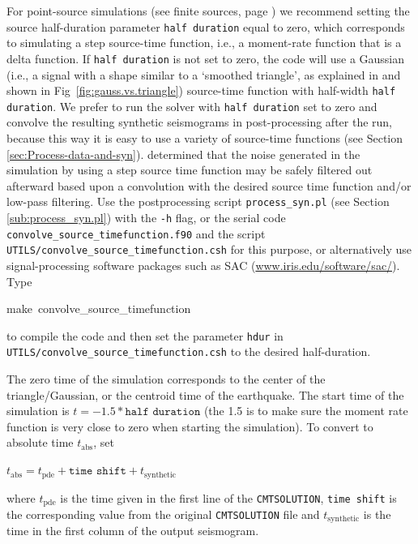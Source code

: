 \documentclass[oneside,english]{book}
\newenvironment{lyxcode}
{\begin{list}{}{
\setlength{\rightmargin}{\leftmargin}
\setlength{\listparindent}{0pt}%
\raggedright
\setlength{\itemsep}{0pt}
\setlength{\parsep}{0pt}
\normalfont\ttfamily}%
 \item[]}
{\end{list}}
\newcommand{\urlwithparentheses}[1]{(\url{#1})}
\begin{document}
\begin{itemize}
\item For point-source simulations (see finite sources, page \pageref{To-simulate-a})
we recommend setting the source half-duration parameter \texttt{half
duration} equal to zero, which corresponds to simulating a step source-time
function, i.e., a moment-rate function that is a delta function. If
\texttt{half duration} is not set to zero, the code will use a Gaussian
(i.e., a signal with a shape similar to a `smoothed triangle', as
explained in \citet{KoTr02a} and shown in Fig~\ref{fig:gauss.vs.triangle})
source-time function with half-width \texttt{half duration}. We prefer
to run the solver with \texttt{half duration} set to zero and convolve
the resulting synthetic seismograms in post-processing after the run,
because this way it is easy to use a variety of source-time functions
(see Section \ref{sec:Process-data-and-syn}). \citet{KoTr02a} determined
that the noise generated in the simulation by using a step source
time function may be safely filtered out afterward based upon a convolution
with the desired source time function and/or low-pass filtering. Use
the postprocessing script \texttt{process\_syn.pl} (see Section \ref{sub:process_syn.pl})
with the \texttt{-h} flag, or the serial code \texttt{convolve\_source\_timefunction.f90}
and the script \texttt{UTILS/convolve\_source\_timefunction.csh} for
this purpose, or alternatively use signal-processing software packages
such as SAC \urlwithparentheses{www.iris.edu/software/sac/}. Type

\begin{lyxcode}
make~convolve\_source\_timefunction
\end{lyxcode}
to compile the code and then set the parameter \texttt{hdur} in \texttt{UTILS/convolve\_source\_timefunction.csh}
to the desired half-duration.

\item The zero time of the simulation corresponds to the center of the triangle/Gaussian,
or the centroid time of the earthquake. The start time of the simulation
is $t=-1.5*\texttt{half duration}$ (the 1.5 is to make sure the moment
rate function is very close to zero when starting the simulation).
To convert to absolute time $t_{\mathrm{abs}}$, set

\begin{lyxcode}
$t_{\mathrm{abs}}=t_{\mathrm{pde}}+\texttt{time shift}+t_{\mathrm{synthetic}}$
\end{lyxcode}
where $t_{\mathrm{pde}}$ is the time given in the first line of the
\texttt{CMTSOLUTION}, \texttt{time shift} is the corresponding value
from the original \texttt{CMTSOLUTION} file and $t_{\mathrm{synthetic}}$
is the time in the first column of the output seismogram.

\end{itemize}
\end{document}
